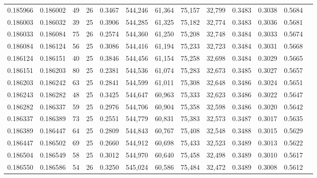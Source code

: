 \begin{tabular}{rrrrrrrrrrrrr}
0.185966 & 0.186002 &    49 &  26 &                                     0.3467 & 544,246 &  61,364 &  75,157 &  32,799 & 0.3483 & 0.3038 & 0.5684 \\
0.186003 & 0.186032 &    39 &  25 &                                     0.3906 & 544,285 &  61,325 &  75,182 &  32,774 & 0.3483 & 0.3036 & 0.5681 \\
0.186033 & 0.186084 &    75 &  26 &                                     0.2574 & 544,360 &  61,250 &  75,208 &  32,748 & 0.3484 & 0.3033 & 0.5674 \\
0.186084 & 0.186124 &    56 &  25 &                                     0.3086 & 544,416 &  61,194 &  75,233 &  32,723 & 0.3484 & 0.3031 & 0.5668 \\
0.186124 & 0.186151 &    40 &  25 &                                     0.3846 & 544,456 &  61,154 &  75,258 &  32,698 & 0.3484 & 0.3029 & 0.5665 \\
0.186151 & 0.186203 &    80 &  25 &                                     0.2381 & 544,536 &  61,074 &  75,283 &  32,673 & 0.3485 & 0.3027 & 0.5657 \\
0.186203 & 0.186242 &    63 &  25 &                                     0.2841 & 544,599 &  61,011 &  75,308 &  32,648 & 0.3486 & 0.3024 & 0.5651 \\
0.186243 & 0.186282 &    48 &  25 &                                     0.3425 & 544,647 &  60,963 &  75,333 &  32,623 & 0.3486 & 0.3022 & 0.5647 \\
0.186282 & 0.186337 &    59 &  25 &                                     0.2976 & 544,706 &  60,904 &  75,358 &  32,598 & 0.3486 & 0.3020 & 0.5642 \\
0.186337 & 0.186389 &    73 &  25 &                                     0.2551 & 544,779 &  60,831 &  75,383 &  32,573 & 0.3487 & 0.3017 & 0.5635 \\
0.186389 & 0.186447 &    64 &  25 &                                     0.2809 & 544,843 &  60,767 &  75,408 &  32,548 & 0.3488 & 0.3015 & 0.5629 \\
0.186447 & 0.186502 &    69 &  25 &                                     0.2660 & 544,912 &  60,698 &  75,433 &  32,523 & 0.3489 & 0.3013 & 0.5622 \\
0.186504 & 0.186549 &    58 &  25 &                                     0.3012 & 544,970 &  60,640 &  75,458 &  32,498 & 0.3489 & 0.3010 & 0.5617 \\
0.186550 & 0.186586 &    54 &  26 &                                     0.3250 & 545,024 &  60,586 &  75,484 &  32,472 & 0.3489 & 0.3008 & 0.5612 \\

\end{tabular}
